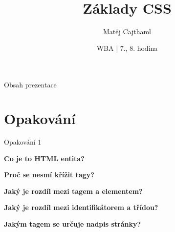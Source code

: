 \documentclass[aspectratio=1610]{beamer}
\title{Základy CSS}
\date{WBA | 7., 8. hodina}
\author[Cajthaml]{Matěj Cajthaml}
\begin{document}
\begin{frame}
\titlepage
\end{frame}

\begin{frame}{Obsah prezentace}
    \begin{cardTiny}
        \begin{minipage}{\textwidth}
            \vspace{1ex}
            \tableofcontents
        \end{minipage}
    \end{cardTiny}
\end{frame}

\section{Opakování}
\begin{frame}{Opakování 1}
    \begin{cardTiny}
        \begin{center}
            \textbf{Co je to HTML entita?}
        \end{center}
    \end{cardTiny}
    \begin{cardTiny}
        \begin{center}
            \textbf{Proč se nesmí křížit tagy?}
        \end{center}
    \end{cardTiny}
    \begin{cardTiny}
        \begin{center}
            \textbf{Jaký je rozdíl mezi tagem a elementem?}
        \end{center}
    \end{cardTiny}
    \begin{cardTiny}
        \begin{center}
            \textbf{Jaký je rozdíl mezi identifikátorem a třídou?}
        \end{center}
    \end{cardTiny}
    \begin{cardTiny}
        \begin{center}
            \textbf{Jakým tagem se určuje nadpis stránky?}
        \end{center}
    \end{cardTiny}
\end{frame}
\end{document}
